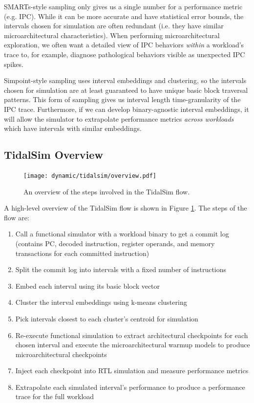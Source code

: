 \documentclass[sigplan,nonacm,10pt]{acmart}
\begin{document}

SMARTs-style sampling only gives us a single number for a performance metric (e.g. IPC).
While it can be more accurate and have statistical error bounds, the intervals chosen for simulation are often redundant (i.e. they have similar microarchitectural characteristics).
When performing microarchitectural exploration, we often want a detailed view of IPC behaviors \textit{within} a workload's trace to, for example, diagnose pathological behaviors visible as unexpected IPC spikes.

Simpoint-style sampling uses interval embeddings and clustering, so the intervals chosen for simulation are at least guaranteed to have unique basic block traversal patterns.
This form of sampling gives us interval length time-granularity of the IPC trace.
Furthermore, if we can develop binary-agnostic interval embeddings, it will allow the simulator to extrapolate performance metrics \textit{across workloads} which have intervals with similar embeddings.

\subsection{TidalSim Overview}

\begin{figure}
  \texttt{[image: dynamic/tidalsim/overview.pdf]}
  \caption{An overview of the steps involved in the TidalSim flow.}
  \label{fig:tidalsim_overview}
\end{figure}

A high-level overview of the TidalSim flow is shown in Figure \ref{fig:tidalsim_overview}.
The steps of the flow are:

\begin{enumerate}
  \item Call a functional simulator with a workload binary to get a commit log (contains PC, decoded instruction, register operands, and memory transactions for each committed instruction)
  \item Split the commit log into intervals with a fixed number of instructions
  \item Embed each interval using its basic block vector
  \item Cluster the interval embeddings using k-means clustering
  \item Pick intervals closest to each cluster's centroid for simulation
  \item Re-execute functional simulation to extract architectural checkpoints for each chosen interval and execute the microarchitectural warmup models to produce microarchitectural checkpoints
  \item Inject each checkpoint into RTL simulation and measure performance metrics
  \item Extrapolate each simulated interval's performance to produce a performance trace for the full workload
\end{enumerate}
\end{document}
